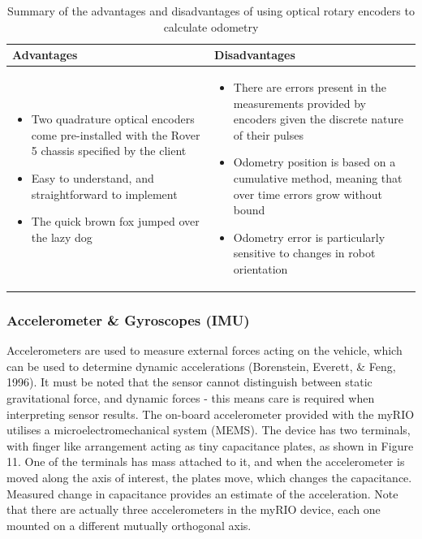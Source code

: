 \documentclass[a4paper]{article}
\begin{document}
\begin{table}[h]
\centering
\caption{Summary of the advantages and disadvantages of using optical rotary encoders to calculate odometry} \footnotesize
\begin{tabular}{p{8cm}p{8cm}}
\toprule
\textbf{Advantages} & \textbf{Disadvantages}\\
\midrule
\begin{itemize}[leftmargin=0.3cm] \item Two quadrature optical encoders come pre-installed with the Rover 5 chassis specified by the client \item Easy to understand, and straightforward to implement \item The quick brown fox jumped over the lazy dog \end{itemize} & \begin{itemize}[leftmargin=0.3cm] \item There are errors present in the measurements provided by encoders given the discrete nature of their pulses \item Odometry position is based on a cumulative method, meaning that over time errors grow without bound \item Odometry error is particularly sensitive to changes in robot orientation \end{itemize}\\
\bottomrule
\end{tabular}
\end{table}


\subsubsection{Accelerometer \& Gyroscopes (IMU)}
Accelerometers are used to measure external forces acting on the vehicle, which can be used to determine dynamic accelerations (Borenstein, Everett, \& Feng, 1996). It must be noted that the sensor cannot distinguish between static gravitational force, and dynamic forces - this means care is required when interpreting sensor results. The on-board accelerometer provided with the myRIO utilises a microelectromechanical system (MEMS). The device has two terminals, with finger like arrangement acting as tiny capacitance plates, as shown in Figure 11. One of the terminals has mass attached to it, and when the accelerometer is moved along the axis of interest, the plates move, which changes the capacitance. Measured change in capacitance provides an estimate of the acceleration. Note that there are actually three accelerometers in the myRIO device, each one mounted on a different mutually orthogonal axis.\\
\end{document}
